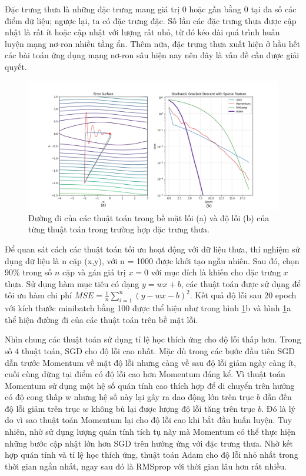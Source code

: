 Đặc trưng thưa là những đặc trưng mang giá trị 0 hoặc gần bằng 0 tại đa số các điểm dữ liệu; ngược lại, ta có đặc trưng đặc. Số lần các đặc trưng thưa được cập nhật là rất ít hoặc cập nhật với lượng rất nhỏ, từ đó kéo dài quá trình huấn luyện mạng nơ-ron nhiều tầng ẩn. Thêm nữa, đặc trưng thưa xuất hiện ở hầu hết các bài toán ứng dụng mạng nơ-ron sâu hiện nay nên đây là vấn đề cần được giải quyết.

\begin{figure}[htp]
	\centering
	\includegraphics[width=130 mm]{images/sparse.png}
	\caption{Đường đi của các thuật toán trong bề mặt lỗi (a) và độ lỗi (b) của từng thuật toán trong trường hợp đặc trưng thưa.}
	\label{fig:sparse}
\end{figure}

Để quan sát cách các thuật toán tối ưu hoạt động với dữ liệu thưa, thí nghiệm sử dụng dữ liệu là n cặp (x,y), với n = 1000 được khởi tạo ngẫu nhiên. Sau đó, chọn 90$\%$ trong số $n$ cặp và gán giá trị $x = 0$ với mục đích là khiến cho đặc trưng $x$ thưa. Sử dụng hàm mục tiêu có dạng $y = wx + b$, các thuật toán được sử dụng để tối ưu hàm chi phí $MSE = \frac{1}{n}\sum_{i=1}^n(y - wx - b)^2$. Kết quả độ lỗi sau 20 epoch với kích thước minibatch bằng 100 được thể hiện như trong hình \ref{fig:sparse}b và hình \ref{fig:sparse}a thể hiện đường đi của các thuật toán trên bề mặt lỗi.

Nhìn chung các thuật toán sử dụng tỉ lệ học thích ứng cho độ lỗi thấp hơn. Trong số 4 thuật toán, SGD cho độ lỗi cao nhất. Mặc dù trong các bước đầu tiên SGD dẫn trước Momentum về mặt độ lỗi nhưng càng về sau độ lỗi giảm ngày càng ít, cuối cùng dừng tại điểm có độ lỗi cao hơn Momentum đáng kể. Vì thuật toán Momentum sử dụng một hệ số quán tính cao thích hợp để di chuyển trên hướng có độ cong thấp w nhưng hệ số này lại gây ra dao động lớn trên trục $b$ dẫn đến độ lỗi giảm trên trục $w$ không bù lại được lượng độ lỗi tăng trên trục $b$. Đó là lý do vì sao thuật toán Momentum lại cho độ lỗi cao khi bắt đầu huấn luyện. Tuy nhiên, nhờ sử dụng lượng quán tính tích tụ này mà Momentum có thể thực hiện những bước cập nhật lớn hơn SGD trên hướng ứng với đặc trưng thưa. Nhờ kết hợp quán tính và tỉ lệ học thích ứng, thuật toán Adam cho độ lỗi nhỏ nhất trong thời gian ngắn nhất, ngay sau đó là RMSprop với thời gian lâu hơn rất nhiều.

